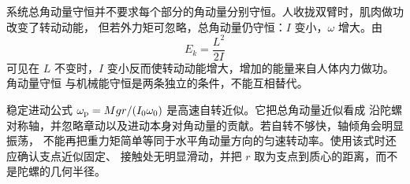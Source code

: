 系统总角动量守恒并不要求每个部分的角动量分别守恒。人收拢双臂时，肌肉做功改变了转动动能，
但若外力矩可忽略，总角动量仍守恒：$I$ 变小，$\omega$ 增大。由
\begin{equation}
 E_k=\frac{L^2}{2I}
\end{equation}
可见在 $L$ 不变时，$I$ 变小反而使转动动能增大，增加的能量来自人体内力做功。角动量守恒
与机械能守恒是两条独立的条件，不能互相替代。

稳定进动公式 $\omega_{\rm p}=Mgr/(I_0\omega_0)$ 是高速自转近似。它把总角动量近似看成
沿陀螺对称轴，并忽略章动以及进动本身对角动量的贡献。若自转不够快，轴倾角会明显振荡，
不能再把重力矩简单等同于水平角动量方向的匀速转动率。使用该式时还应确认支点近似固定、
接触处无明显滑动，并把 $r$ 取为支点到质心的距离，而不是陀螺的几何半径。
